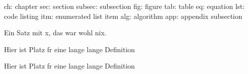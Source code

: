 ch:		chapter
sec:	section
subsec:	subsection
fig:	figure
tab:	table
eq:		equation
lst:	code listing
itm:	enumerated list item
alg:	algorithm
app:	appendix subsection


\begin{theorem}
Ein Satz mit x, das war wohl nix.
\end{theorem}
\begin{definition}
Hier ist Platz fr eine lange lange Definition
\end{definition}
\begin{lemma}
Hier ist Platz fr eine lange lange Definition
\end{lemma}

